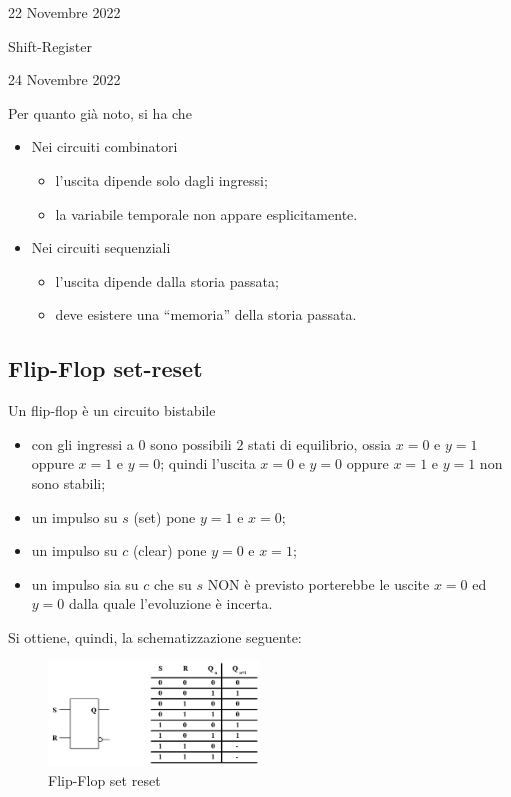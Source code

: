 \documentclass[a4paper]{extarticle}
\newcommand{\quotes}[1]{``#1''}
\begin{document}
\newpage
\begin{center}
    22 Novembre 2022
\end{center}
Shift-Register

\newpage
\begin{center}
    24 Novembre 2022
\end{center}
Per quanto già noto, si ha che
\begin{itemize}
    \item Nei circuiti combinatori
    \begin{itemize}
        \item l'uscita dipende solo dagli ingressi;
        \item la variabile temporale non appare esplicitamente.
    \end{itemize}
    \item Nei circuiti sequenziali
    \begin{itemize}
        \item l'uscita dipende dalla storia passata;
        \item deve esistere una \quotes{memoria} della storia passata.
    \end{itemize}
\end{itemize}

\vspace{1em}
\subsection{Flip-Flop set-reset}
Un flip-flop è un circuito bistabile
\begin{itemize}
    \item con gli ingressi a $0$ sono possibili $2$ stati di equilibrio, ossia $x=0$ e $y=1$ oppure $x=1$ e $y=0$; quindi l'uscita $x=0$ e $y=0$ oppure $x=1$ e $y=1$ non sono stabili;
    \item un impulso su $s$ (set) pone $y=1$ e $x=0$;
    \item un impulso su $c$ (clear) pone $y=0$ e $x=1$;
    \item un impulso sia su $c$ che su $s$ NON è previsto porterebbe le uscite $x=0$ ed $y=0$ dalla quale l'evoluzione è incerta.
\end{itemize}
Si ottiene, quindi, la schematizzazione seguente:

\begin{figure}[H]
    \centering
    \includegraphics[width=0.5\textwidth]{flip-flop-set-reset.png}
    \caption{Flip-Flop set reset}
    \label{fig:flip-flop-set-reset}
\end{figure}
\end{document}
